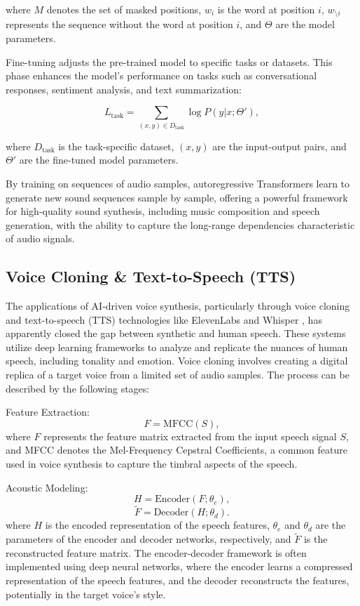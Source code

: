 \documentclass[11pt,a4paper,oneside]{report}
\begin{document}
where $M$ denotes the set of masked positions, $w_i$ is the word at position $i$, $w_{\setminus i}$ represents the sequence without the word at position $i$, and $\Theta$ are the model parameters.

Fine-tuning adjusts the pre-trained model to specific tasks or datasets. This phase enhances the model's performance on tasks such as conversational responses, sentiment analysis, and text summarization:

\begin{equation}
L_{\text{task}} = \sum_{(x, y) \in D_{\text{task}}} \log P(y | x; \Theta'),
\end{equation}

where $D_{\text{task}}$ is the task-specific dataset, $(x, y)$ are the input-output pairs, and $\Theta'$ are the fine-tuned model parameters.

By training on sequences of audio samples, autoregressive Transformers learn to generate new sound sequences sample by sample, offering a powerful framework for high-quality sound synthesis, including music composition and speech generation, with the ability to capture the long-range dependencies characteristic of audio signals.

\subsection{Voice Cloning \& Text-to-Speech (TTS)}

The applications of AI-driven voice synthesis, particularly through voice cloning and text-to-speech (TTS) technologies like ElevenLabs \cite{elevenlabs} and Whisper \cite{OpenAIWhisper}, has apparently closed the gap between synthetic and human speech. 
These systems utilize deep learning frameworks to analyze and replicate the nuances of human speech, including tonality and emotion. 
Voice cloning involves creating a digital replica of a target voice from a limited set of audio samples. 
The process can be described by the following stages:

Feature Extraction:
\begin{equation}
F = \text{MFCC}(S),
\end{equation}
where $F$ represents the feature matrix extracted from the input speech signal $S$, and MFCC denotes the Mel-Frequency Cepstral Coefficients, a common feature used in voice synthesis to capture the timbral aspects of the speech.

Acoustic Modeling:
\begin{equation}
H = \text{Encoder}(F; \theta_e),
\end{equation}
\begin{equation}
\tilde{F} = \text{Decoder}(H; \theta_d).
\end{equation}
where $H$ is the encoded representation of the speech features, $\theta_e$ and $\theta_d$ are the parameters of the encoder and decoder networks, respectively, and $\tilde{F}$ is the reconstructed feature matrix. The encoder-decoder framework is often implemented using deep neural networks, where the encoder learns a compressed representation of the speech features, and the decoder reconstructs the features, potentially in the target voice's style.
\end{document}

